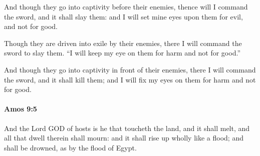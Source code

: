 			\begin{versebox}
					\item[BHS] 
					\item[LXX] 
					\item[ASV] And though they go into captivity before their enemies, thence will I command the sword, and it shall slay them: and I will set mine eyes upon them for evil, and not for good.
					\item[NIV] Though they are driven into exile by their enemies, there I will command the sword to slay them. “I will keep my eye on them for harm and not for good.”
					\item[NRSV] And though they go into captivity in front of their enemies, there I will command the sword, and it shall kill them; and I will fix my eyes on them for harm and not for good.
			\end{versebox}

		\paragraph{Amos 9:5} %
			\label{AMOS-9-5}

			And the Lord GOD of hosts is he that toucheth the land, and it shall melt, and all that dwell therein shall mourn: and it shall rise up wholly like a flood; and shall be drowned, as by the flood of Egypt.

